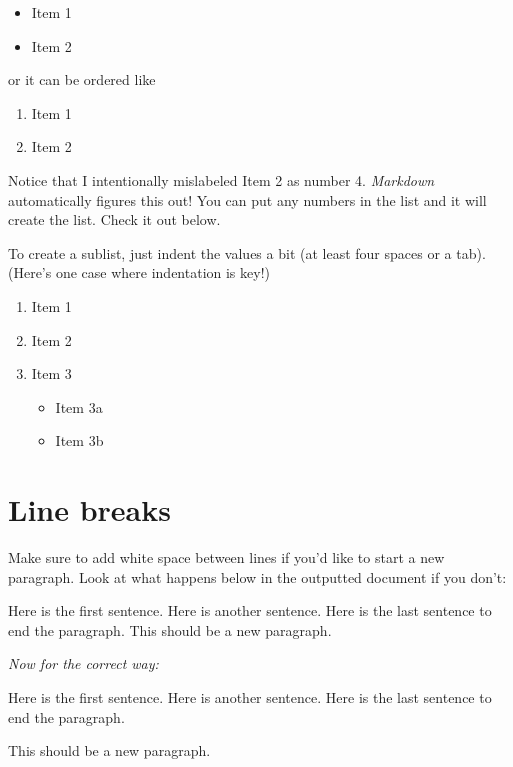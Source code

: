 \documentclass[print]{nuthesis}
\providecommand{\tightlist}{%
  \setlength{\itemsep}{0pt}\setlength{\parskip}{0pt}}
\begin{document}
\begin{itemize}
\tightlist
\item
  Item 1
\item
  Item 2
\end{itemize}

or it can be ordered like

\begin{enumerate}
\def\labelenumi{\arabic{enumi}.}
\tightlist
\item
  Item 1
\item
  Item 2
\end{enumerate}

Notice that I intentionally mislabeled Item 2 as number 4. \emph{Markdown} automatically figures this out! You can put any numbers in the list and it will create the list. Check it out below.

To create a sublist, just indent the values a bit (at least four spaces or a tab). (Here's one case where indentation is key!)

\begin{enumerate}
\def\labelenumi{\arabic{enumi}.}
\tightlist
\item
  Item 1
\item
  Item 2
\item
  Item 3

  \begin{itemize}
  \tightlist
  \item
    Item 3a
  \item
    Item 3b
  \end{itemize}
\end{enumerate}

\hypertarget{line-breaks}{%
\section{Line breaks}\label{line-breaks}}

Make sure to add white space between lines if you'd like to start a new paragraph. Look at what happens below in the outputted document if you don't:

Here is the first sentence. Here is another sentence. Here is the last sentence to end the paragraph.
This should be a new paragraph.

\emph{Now for the correct way:}

Here is the first sentence. Here is another sentence. Here is the last sentence to end the paragraph.

This should be a new paragraph.
\end{document}
